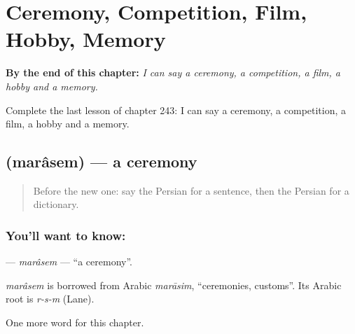 
\chapter{Ceremony, Competition, Film, Hobby, Memory}
\label{ch:fa-ceremony-competition-film-hobby-memory}

\begin{chapteropening}
\textbf{By the end of this chapter:} \emph{I can say a ceremony, a competition, a film, a hobby and a memory.}

Complete the last lesson of chapter 243: I can say a ceremony, a competition, a film, a hobby and a memory.
\end{chapteropening}

\section[\texorpdfstring{\fa{مراسم} (marâsem)}{مراسم (marâsem)}]{ (marâsem) — a ceremony}

\label{lesson:FA-C243-marasem}



\begin{quote}
Before the new one: say the Persian for a sentence, then the Persian for a dictionary.
\end{quote}

\subsection*{You'll want to know: }
\textbf{} — \emph{marâsem} — \textquotedblleft{}a ceremony\textquotedblright{}.

\begin{cousinweb}
\emph{marâsem} is borrowed from Arabic \emph{marāsim}, \textquotedblleft{}ceremonies, customs\textquotedblright{}. Its Arabic root is \emph{r-s-m} (Lane).
\end{cousinweb}

\begin{grammarlens}[title={What you've built}]
One more word for this chapter.
\end{grammarlens}

